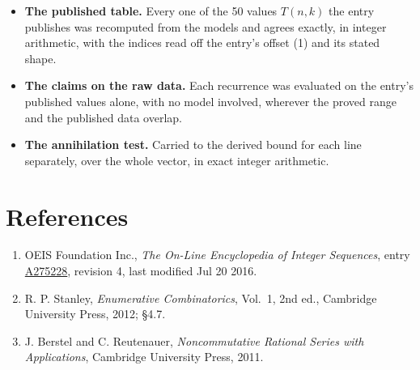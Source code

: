 \documentclass[11pt]{article}
\theoremstyle{definition}
\begin{document}
\begin{itemize}

\item {\bfseries The published table.} Every one of the 50 values $T(n,k)$ the entry publishes was recomputed from the models and agrees exactly, in integer arithmetic, with the indices read off the entry's offset (1) and its stated shape.

\item {\bfseries The claims on the raw data.} Each recurrence was evaluated on the entry's published values alone, with no model involved, wherever the proved range and the published data overlap.

\item {\bfseries The annihilation test.} Carried to the derived bound for each line separately, over the whole vector, in exact integer arithmetic.

\end{itemize}

\section{References}

\begin{enumerate}

\item OEIS Foundation Inc., \emph{The On-Line Encyclopedia of Integer Sequences}, entry \href{https://oeis.org/A275228}{A275228}, revision 4, last modified Jul 20 2016.

\item R. P. Stanley, \emph{Enumerative Combinatorics}, Vol.~1, 2nd ed., Cambridge University Press, 2012; \S4.7.

\item J. Berstel and C. Reutenauer, \emph{Noncommutative Rational Series with Applications}, Cambridge University Press, 2011.

\end{enumerate}
\end{document}
